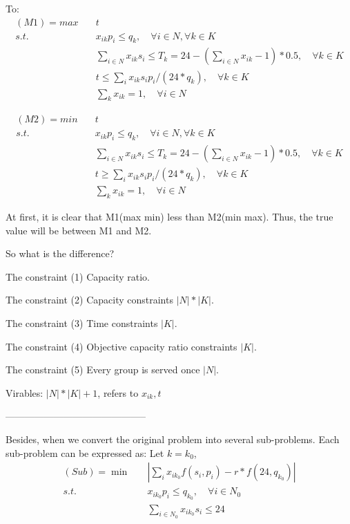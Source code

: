 To:
$$
\begin{aligned}
(M1) = max \quad & t \\
s.t. \quad  & x_{ik} p_i \leq q_k, \quad \forall i \in N,  \forall k \in K  \\
& \sum_{i\in N} x_{ik} s_i \leq T_k = 24 - (\sum_{i\in N} x_{ik} - 1)*0.5,\quad\forall k \in K \\
& t \leq \sum_i{x_{ik} s_i p_i}/(24 * q_k),\quad  \forall k \in K \\
& \sum_{k} x_{ik} =1,\quad \forall i \in N
\end{aligned}$$

$$
\begin{aligned}
(M2) = min \quad & t \\
s.t. \quad  & x_{ik} p_i \leq q_k, \quad \forall i \in N,  \forall k \in K  \\
& \sum_{i\in N} x_{ik} s_i \leq T_k = 24 - (\sum_{i\in N} x_{ik} - 1)*0.5,\quad\forall k \in K \\
& t \geq \sum_i{x_{ik} s_i p_i}/(24 * q_k),\quad  \forall k \in K \\
& \sum_{k} x_{ik} =1,\quad \forall i \in N
\end{aligned}$$

At first, it is clear that M1(max min) less than M2(min max).
Thus, the true value will be between M1 and M2.


So what is the difference?

The constraint (1) Capacity ratio.

The constraint (2) Capacity constraints $|N|*|K|$.

The constraint (3) Time constraints $|K|$.

The constraint (4) Objective capacity ratio constraints $|K|$.

The constraint (5) Every group is served once $|N|$.

Virables: $|N|*|K|+1$, refers to $x_{ik},t$

--------------------------------------------

Besides, when we convert the original problem into several sub-problems.
Each sub-problem can be expressed as:
Let $k = k_0$,
$$
\begin{aligned}
(Sub) = \min \quad & |\sum_i{x_{ik_0} f(s_i,p_i)}-r*f(24, q_{k_0})| \\
s.t. \quad  & x_{ik_0} p_i \leq q_{k_0}, \quad \forall i \in N_0  \\
& \sum_{i\in N_0} x_{ik_0} s_i \leq 24 \\
\end{aligned}$$

